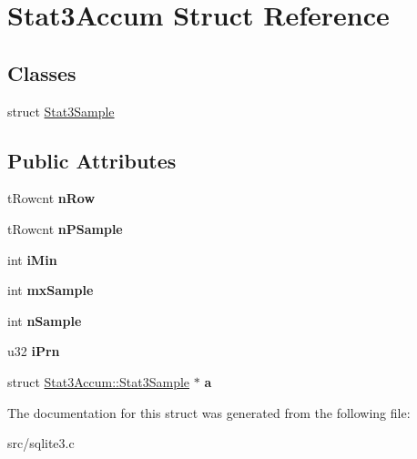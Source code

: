 \hypertarget{struct_stat3_accum}{\section{Stat3\-Accum Struct Reference}
\label{struct_stat3_accum}
}
\subsection*{Classes}
\begin{DoxyCompactItemize}
\item 
struct \hyperlink{struct_stat3_accum_1_1_stat3_sample}{Stat3\-Sample}
\end{DoxyCompactItemize}
\subsection*{Public Attributes}
\begin{DoxyCompactItemize}
\item 
\hypertarget{struct_stat3_accum_a9232d8f0271bc7feff09927e1683fdfc}{t\-Rowcnt {\bfseries n\-Row}}\label{struct_stat3_accum_a9232d8f0271bc7feff09927e1683fdfc}

\item 
\hypertarget{struct_stat3_accum_aaad385a6c7100fc8674f98bee196d78d}{t\-Rowcnt {\bfseries n\-P\-Sample}}\label{struct_stat3_accum_aaad385a6c7100fc8674f98bee196d78d}

\item 
\hypertarget{struct_stat3_accum_a33a25df2bf3dae63cc1960d4e5586e1d}{int {\bfseries i\-Min}}\label{struct_stat3_accum_a33a25df2bf3dae63cc1960d4e5586e1d}

\item 
\hypertarget{struct_stat3_accum_a736d6f6da776d17f54a87e31a457f4bb}{int {\bfseries mx\-Sample}}\label{struct_stat3_accum_a736d6f6da776d17f54a87e31a457f4bb}

\item 
\hypertarget{struct_stat3_accum_a184bb13725f39f27c8d8af88a52d198e}{int {\bfseries n\-Sample}}\label{struct_stat3_accum_a184bb13725f39f27c8d8af88a52d198e}

\item 
\hypertarget{struct_stat3_accum_a44d4e5372a3656038d935b09e4d5d8de}{u32 {\bfseries i\-Prn}}\label{struct_stat3_accum_a44d4e5372a3656038d935b09e4d5d8de}

\item 
\hypertarget{struct_stat3_accum_ab4c3e63dea8ab19f10fd636e8062c108}{struct \hyperlink{struct_stat3_accum_1_1_stat3_sample}{Stat3\-Accum\-::\-Stat3\-Sample} $\ast$ {\bfseries a}}\label{struct_stat3_accum_ab4c3e63dea8ab19f10fd636e8062c108}

\end{DoxyCompactItemize}


The documentation for this struct was generated from the following file\-:\begin{DoxyCompactItemize}
\item 
src/sqlite3.\-c\end{DoxyCompactItemize}
